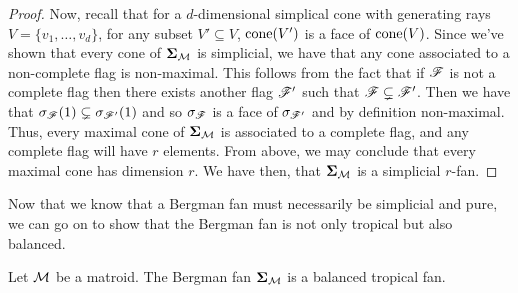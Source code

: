 \documentclass[12pt,oneside]{../../sfsuthesis}
\begin{document}
\begin{proof}
    Now, recall that for a \( d \)-dimensional simplical cone with generating rays \(  V = \{ v_1, \dots, v_d \} \), for any subset \( V' \subseteq V \),
    \( \mathrm{cone}(V') \) is a face of \( \mathrm{cone}(V) \).
    Since we've  shown that every cone of \( {\bm{\Sigma}}_{\mathcal{M}} \) is simplicial, we have that any cone associated to a non-complete flag is non-maximal.
    This follows from the fact that if \( \mathscr{F} \) is not a complete flag then there exists another flag \( \mathscr{F}' \) such that \( \mathscr{F} \subsetneq \mathscr{F}' \).
    Then we have that \( \sigma_{\mathscr{F}}(1) \subsetneq \sigma_{\mathscr{F}'}(1) \) and so \( \sigma_{\mathscr{F}} \) is a face of \( \sigma_{\mathscr{F}'} \) and by definition non-maximal.
    Thus, every maximal cone of \( {\bm{\Sigma}}_{\mathcal{M}} \) is associated to a complete flag, and any complete flag will have \( r \) elements.
    From above, we may conclude that every maximal cone has dimension \( r \).
    We have then, that \( {\bm{\Sigma}}_{\mathcal{M}} \) is a simplicial \( r \)-fan.
\end{proof}
Now that we know that a Bergman fan must necessarily be simplicial and pure, we can go on to show that the Bergman fan is not only tropical but also balanced.
\begin{proposition}
    Let \( \mathcal{M} \) be a matroid.
    The Bergman fan \( {\bm{\Sigma}}_{\mathcal{M}} \) is a balanced tropical fan.
\end{proposition}
\end{document}
